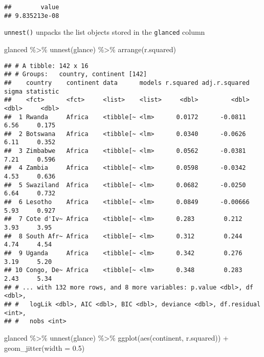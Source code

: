 \documentclass[
]{book}
\newenvironment{Shaded}{\begin{snugshade}}{\end{snugshade}}
\newcommand{\AttributeTok}[1]{\textcolor[rgb]{0.77,0.63,0.00}{#1}}
\newcommand{\FloatTok}[1]{\textcolor[rgb]{0.00,0.00,0.81}{#1}}
\newcommand{\FunctionTok}[1]{\textcolor[rgb]{0.00,0.00,0.00}{#1}}
\newcommand{\NormalTok}[1]{#1}
\newcommand{\SpecialCharTok}[1]{\textcolor[rgb]{0.00,0.00,0.00}{#1}}
\begin{document}
\begin{verbatim}
##        value 
## 9.835213e-08
\end{verbatim}

\texttt{unnest()} unpacks the list objects stored in the \texttt{glanced} column

\begin{Shaded}
\begin{Highlighting}[]
\NormalTok{glanced }\SpecialCharTok{\%\textgreater{}\%}
  \FunctionTok{unnest}\NormalTok{(glance) }\SpecialCharTok{\%\textgreater{}\%}
  \FunctionTok{arrange}\NormalTok{(r.squared) }
\end{Highlighting}
\end{Shaded}

\begin{verbatim}
## # A tibble: 142 x 16
## # Groups:   country, continent [142]
##    country    continent data      models r.squared adj.r.squared sigma statistic
##    <fct>      <fct>     <list>    <list>     <dbl>         <dbl> <dbl>     <dbl>
##  1 Rwanda     Africa    <tibble[~ <lm>      0.0172      -0.0811   6.56     0.175
##  2 Botswana   Africa    <tibble[~ <lm>      0.0340      -0.0626   6.11     0.352
##  3 Zimbabwe   Africa    <tibble[~ <lm>      0.0562      -0.0381   7.21     0.596
##  4 Zambia     Africa    <tibble[~ <lm>      0.0598      -0.0342   4.53     0.636
##  5 Swaziland  Africa    <tibble[~ <lm>      0.0682      -0.0250   6.64     0.732
##  6 Lesotho    Africa    <tibble[~ <lm>      0.0849      -0.00666  5.93     0.927
##  7 Cote d'Iv~ Africa    <tibble[~ <lm>      0.283        0.212    3.93     3.95 
##  8 South Afr~ Africa    <tibble[~ <lm>      0.312        0.244    4.74     4.54 
##  9 Uganda     Africa    <tibble[~ <lm>      0.342        0.276    3.19     5.20 
## 10 Congo, De~ Africa    <tibble[~ <lm>      0.348        0.283    2.43     5.34 
## # ... with 132 more rows, and 8 more variables: p.value <dbl>, df <dbl>,
## #   logLik <dbl>, AIC <dbl>, BIC <dbl>, deviance <dbl>, df.residual <int>,
## #   nobs <int>
\end{verbatim}

\begin{Shaded}
\begin{Highlighting}[]
\NormalTok{glanced }\SpecialCharTok{\%\textgreater{}\%}
  \FunctionTok{unnest}\NormalTok{(glance) }\SpecialCharTok{\%\textgreater{}\%}
  \FunctionTok{ggplot}\NormalTok{(}\FunctionTok{aes}\NormalTok{(continent, r.squared)) }\SpecialCharTok{+}
  \FunctionTok{geom\_jitter}\NormalTok{(}\AttributeTok{width =} \FloatTok{0.5}\NormalTok{)}
\end{Highlighting}
\end{Shaded}
\end{document}
